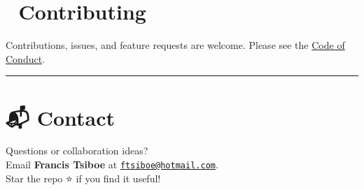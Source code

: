 \documentclass[
]{article}
\begin{document}
\section{🤝 Contributing}\label{contributing}

Contributions, issues, and feature requests are welcome. Please see the
\href{code_of_conduct.md}{Code of Conduct}.

\begin{center}\rule{0.5\linewidth}{0.5pt}\end{center}

\section{📬 Contact}\label{contact}

Questions or collaboration ideas?\\
Email \textbf{Francis Tsiboe} at
\href{mailto:ftsiboe@hotmail.com}{\nolinkurl{ftsiboe@hotmail.com}}.\\
Star the repo ⭐ if you find it useful!
\end{document}
